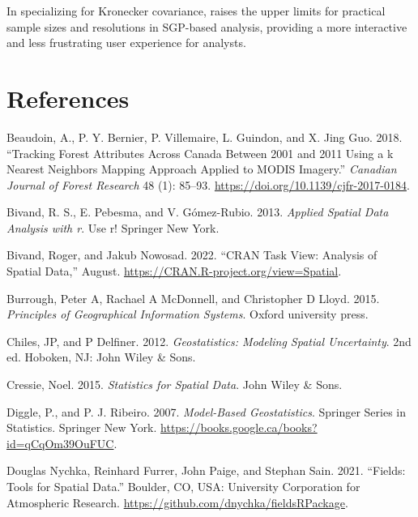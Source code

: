 In specializing for Kronecker covariance,  raises the upper limits for practical sample sizes and resolutions in SGP-based analysis, providing a more interactive and less frustrating user experience for analysts.

\hypertarget{references}{%
\section*{References}\label{references}}

\hypertarget{refs}{}
\begin{CSLReferences}{1}{0}
\leavevmode{}%
Beaudoin, A., P. Y. Bernier, P. Villemaire, L. Guindon, and X. Jing Guo. 2018. {``Tracking Forest Attributes Across Canada Between 2001 and 2011 Using a k Nearest Neighbors Mapping Approach Applied to MODIS Imagery.''} \emph{Canadian Journal of Forest Research} 48 (1): 85--93. \url{https://doi.org/10.1139/cjfr-2017-0184}.

\leavevmode{}%
Bivand, R. S., E. Pebesma, and V. Gómez-Rubio. 2013. \emph{Applied Spatial Data Analysis with r}. Use r! Springer New York.

\leavevmode{}%
Bivand, Roger, and Jakub Nowosad. 2022. {``CRAN Task View: Analysis of Spatial Data,''} August. \url{https://CRAN.R-project.org/view=Spatial}.

\leavevmode{}%
Burrough, Peter A, Rachael A McDonnell, and Christopher D Lloyd. 2015. \emph{Principles of Geographical Information Systems}. Oxford university press.

\leavevmode{}%
Chiles, JP, and P Delfiner. 2012. \emph{Geostatistics: Modeling Spatial Uncertainty}. 2nd ed. Hoboken, NJ: John Wiley \& Sons.

\leavevmode{}%
Cressie, Noel. 2015. \emph{Statistics for Spatial Data}. John Wiley \& Sons.

\leavevmode{}%
Diggle, P., and P. J. Ribeiro. 2007. \emph{Model-Based Geostatistics}. Springer Series in Statistics. Springer New York. \url{https://books.google.ca/books?id=qCqOm39OuFUC}.

\leavevmode{}%
Douglas Nychka, Reinhard Furrer, John Paige, and Stephan Sain. 2021. {``Fields: Tools for Spatial Data.''} Boulder, CO, USA: University Corporation for Atmospheric Research. \url{https://github.com/dnychka/fieldsRPackage}.


\end{CSLReferences}

